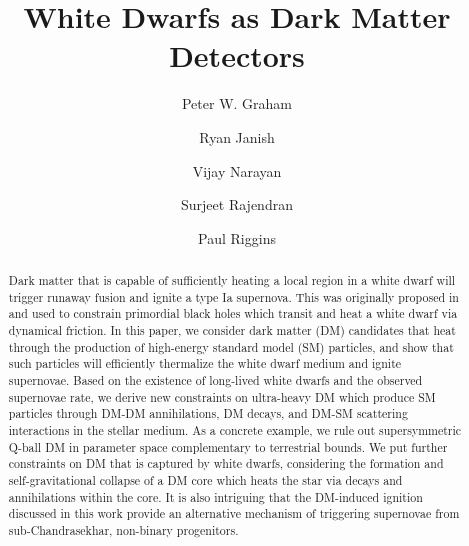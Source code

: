 \documentclass[preprintnumbers,amsmath,amssymb,prd,superscriptaddress]{revtex4}
\begin{document}

\title{White Dwarfs as Dark Matter Detectors}

\author{Peter W. Graham}

\author{Ryan Janish}

\author{Vijay Narayan}

\author{Surjeet Rajendran}

\author{Paul Riggins}

\begin{abstract}
Dark matter that is capable of sufficiently heating a local region in a white dwarf will trigger runaway fusion and ignite a type Ia supernova.
This was originally proposed in~\cite{Graham:2015apa} and used to constrain primordial black holes which transit and heat a white dwarf via dynamical friction.
In this paper, we consider dark matter (DM) candidates that heat through the production of high-energy standard model (SM) particles, and show that such particles will efficiently thermalize the white dwarf medium and ignite supernovae.
Based on the existence of long-lived white dwarfs and the observed supernovae rate, we derive new constraints on ultra-heavy DM which produce SM particles through DM-DM annihilations, DM decays, and DM-SM scattering interactions in the stellar medium. 
As a concrete example, we rule out supersymmetric Q-ball DM in parameter space complementary to terrestrial bounds.
We put further constraints on DM that is captured by white dwarfs, considering the formation and self-gravitational collapse of a DM core which heats the star via decays and annihilations within the core.
It is also intriguing that the DM-induced ignition discussed in this work provide an alternative mechanism of triggering supernovae from sub-Chandrasekhar, non-binary progenitors.
\end{abstract}

\maketitle
\end{document}
